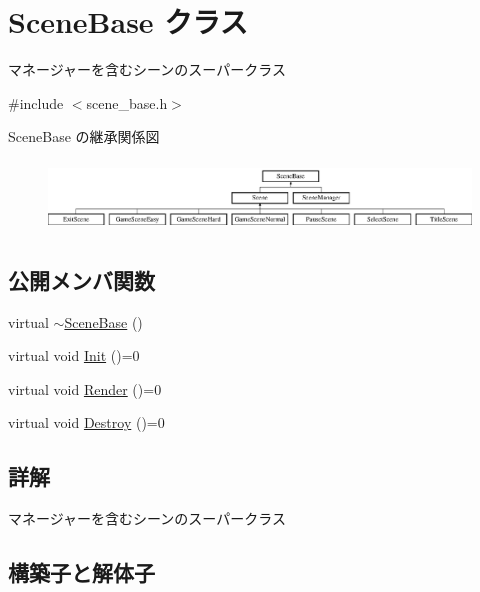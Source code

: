 \hypertarget{class_scene_base}{}\section{Scene\+Base クラス}
\label{class_scene_base}


マネージャーを含むシーンのスーパークラス  




{\ttfamily \#include $<$scene\+\_\+base.\+h$>$}

Scene\+Base の継承関係図\begin{figure}[H]
\begin{center}
\leavevmode
\includegraphics[height=1.875000cm]{class_scene_base}
\end{center}
\end{figure}
\subsection*{公開メンバ関数}
\begin{DoxyCompactItemize}
\item 
virtual \mbox{\hyperlink{class_scene_base_a187dd160e5a16909bcc6529851e38318}{$\sim$\+Scene\+Base}} ()
\item 
virtual void \mbox{\hyperlink{class_scene_base_a24d7db43c819924dc8b07b436f6d3148}{Init}} ()=0
\item 
virtual void \mbox{\hyperlink{class_scene_base_ad981674ce731ea267f398e889bbb9dc3}{Render}} ()=0
\item 
virtual void \mbox{\hyperlink{class_scene_base_a7c5b54020bc519b4dadfe9770d6b27f7}{Destroy}} ()=0
\end{DoxyCompactItemize}


\subsection{詳解}
マネージャーを含むシーンのスーパークラス 

\subsection{構築子と解体子}
\mbox{\label{class_scene_base_a187dd160e5a16909bcc6529851e38318}} 
